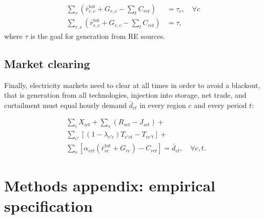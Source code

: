 \documentclass[authoryear]{elsarticle}
\begin{document}
\begin{subequations}
	\begin{align}
	\sum_r\left(\bar{r}^\mathrm{tot}_{r,c} + G_{r,c} - \sum_t C_{rct}\right) &= \tau_c, \quad \forall c \label{eq:mkt_quota_country}  \\
	\sum_{r,c}\left(\bar{r}^\mathrm{tot}_{r,c} + G_{r,c} - \sum_t C_{rct}\right) &= \tau, \label{eq:mkt_quota_eu} 
	\end{align}
\end{subequations}
where $\tau$ is the goal for generation from RE sources.

\subsection{Market clearing}
Finally, electricity markets need to clear at all times in order to avoid a blackout, that is generation from all technologies, injection into storage, net trade, and curtailment must equal hourly demand $\bar{d}_{ct}$ in every region $c$ and every period $t$: 

\begin{align}
&\sum_{i} X_{ict} + \sum_s \left(R_{sct} - J_{sct}\right) + \\ \nonumber
&\sum_{c'} \left[\left(1-\lambda_{c'c}\right)T_{c'ct} - T_{cc't}\right] +\\ \nonumber
&\sum_r \left[\alpha_{rct}\left(\bar{r}^\mathrm{tot}_{rc} + G_{rc}\right) - C_{rct} \right] = 
\bar{d}_{ct}, \quad \forall c,t.
\end{align}


\section{Methods appendix: empirical specification}
\end{document}
